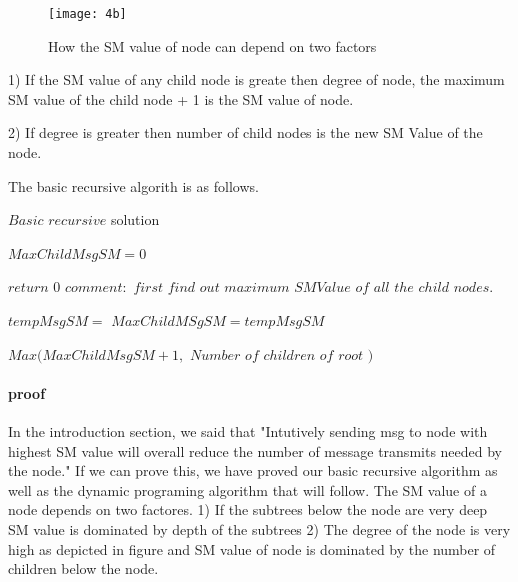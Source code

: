 \begin{figure}[4b]
    \centering
    \texttt{[image: 4b]}
    \caption{How the SM value of node can depend on two factors}
    \label{fig:4b}
\end{figure}




1) If the SM value of any child node is greate then degree of node, the maximum SM value of the child node  + 1 is the SM value of node.

2) If degree is greater then number of child nodes is the new SM Value of the node. 

The basic recursive algorith is as follows. 


\begin{algorithm}
	\caption{$Basic $ $recursive $ solution}
	\begin{algorithmic}
		\State $ MaxChildMsgSM = 0 $
		
			\State $ return$ $ 0$ 	
		\EndIf
	  	\State 		
		\State $ comment: $ $ first $ $ find $ $ out $ $ maximum $ $ SMValue $  $ of $ $ all $ $ the $ $ child $ $ nodes.$		
		
		\State $tempMsgSM =$  
			\State $MaxChildMSgSM = tempMsgSM$
		\EndIf
		\State	
		
		\EndFor
		
		\Return $ Max(MaxChildMsgSM + 1, $ $ Number$ $ of $ $ children $ $ of $ $ root $ $ ) $
			 
	  \EndFunction
	
	  
	\end{algorithmic}
\end{algorithm}


\paragraph{proof}
In the introduction section, we said that "Intutively sending msg to node with highest SM value will overall reduce the number of message transmits needed by the node." If we can prove this, we have proved our basic recursive algorithm as well as the dynamic programing algorithm that will follow. The SM value of a node depends on two factores. 1) If the subtrees below the node are very deep SM value is dominated by depth of the subtrees 2) The degree of the node is very high as depicted in figure and SM value of node is dominated by the number of children below the node. 

